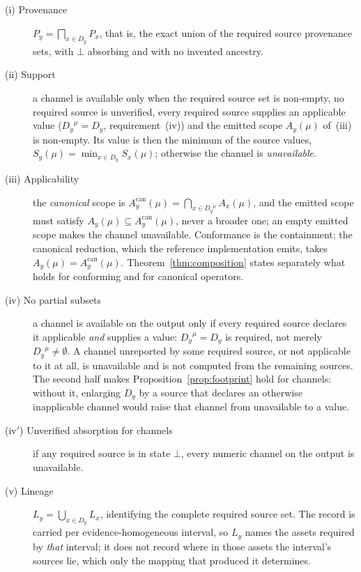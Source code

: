 \documentclass[preprint,3p,11pt,authoryear]{elsarticle}
\newcommand{\Dy}{\ensuremath{D_y}}
\begin{document}
\begin{description}
\item[(i) Provenance] $P_y = \bigsqcap_{x \in \Dy} P_x$, that is, the exact
  union of the required source provenance sets, with $\bot$ absorbing and with
  no invented ancestry.
\item[(ii) Support] a channel is available only when the required source set is
  non-empty, no required source is unverified, every required source supplies an applicable value
  ($\Dy^{\mu} = \Dy$, requirement~(iv)) and the emitted scope $A_y(\mu)$
  of~(iii) is non-empty. Its value is then the minimum of the source values,
  $S_y(\mu) = \min_{x \in \Dy} S_x(\mu)$; otherwise the channel is
  \emph{unavailable}.
\item[(iii) Applicability] the \emph{canonical} scope is
  $A_y^{\mathrm{can}}(\mu) = \bigcap_{x \in \Dy^{\mu}} A_x(\mu)$, and the
  emitted scope must satisfy $A_y(\mu) \subseteq A_y^{\mathrm{can}}(\mu)$, never
  a broader one; an empty emitted scope makes the channel unavailable.
  Conformance is the containment; the canonical reduction, which the reference
  implementation emits, takes $A_y(\mu) = A_y^{\mathrm{can}}(\mu)$. Theorem~\ref{thm:composition} states separately what
  holds for conforming and for canonical operators.
\item[(iv) No partial subsets] a channel is available on the output only if
  every required source declares it applicable \emph{and} supplies a value:
  $\Dy^{\mu} = \Dy$ is required, not merely $\Dy^{\mu} \neq \emptyset$. A
  channel unreported by some required source, or not applicable to it at all,
  is unavailable and is not computed from the remaining sources. The second
  half makes Proposition~\ref{prop:footprint} hold for channels:
  without it, enlarging $\Dy$ by a source that declares an otherwise
  inapplicable channel would raise that channel from unavailable to a value.
\item[(iv$'$) Unverified absorption for channels] if any required source is in
  state $\bot$, every numeric channel on the output is unavailable.
\item[(v) Lineage] $L_y = \bigcup_{x \in \Dy} L_x$, identifying the complete
  required source set. The record is carried per evidence-homogeneous interval,
  so $L_y$ names the assets required by \emph{that} interval; it does not
  record where in those assets the interval's sources lie, which only the
  mapping that produced it determines.
\end{description}
\end{document}
